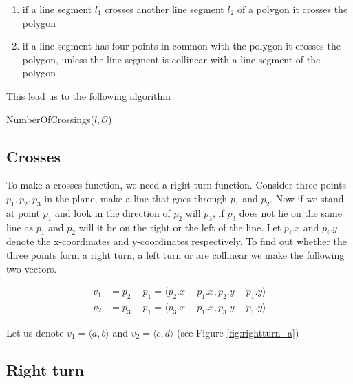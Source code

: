 \begin{enumerate}
	\item if a line segment $l_1$ crosses another line segment $l_2$ of a polygon it 
	      crosses the polygon
	\item if a line segment has four points in common with the polygon it crosses the
		  polygon, unless the line segment is collinear with a line segment of the
		  polygon 
\end{enumerate}

This lead us to the following algorithm
\begin{algorithm} 
	\caption{NumberOfCrossings($l,\mathcal{O}$)}
	\begin{algorithmic}[1] 
				\EndIf
			\EndFor
			\EndIf
		\EndFor
	\end{algorithmic}
\end{algorithm}

\subsection{Crosses}
To make a crosses function, we need a right turn function. Consider three
points $p_1,p_2,p_3$ in the plane, make a line that goes through $p_1$ and $p_2$. 
Now if we stand at point $p_1$ and look in the direction of $p_2$ will $p_3$, if $p_3$
does not lie on the same line as $p_1$ and $p_2$ will it be on the
right or the left of the line. Let $p_i.x$ and $p_i.y$ denote the x-coordinates
and y-coordinates respectively. To find out whether the three points form a right turn, 
a left turn or are collinear we make the following two vectors.

\begin{align*}
	v_1 &=p_2-p_1 = \langle p_2.x-p_1.x,p_2.y-p_1.y\rangle\\
	v_2 &=p_3-p_1 = \langle p_3.x-p_1.x,p_3.y-p_1.y\rangle
\end{align*}

Let us denote $v_1 = \langle a,b\rangle$ and $v_2 = \langle c,d\rangle$
(see Figure \ref{fig:rightturn_a})

\subsection{Right turn}

